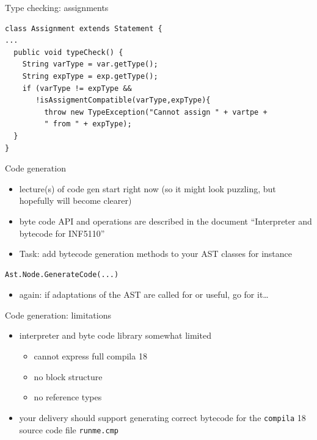 \documentclass{beamer}
\begin{document}
\begin{frame}[fragile,plain,label={sec:org7272385}]{Type checking: assignments}
 \lstset{language=java,label= ,caption= ,captionpos=b,numbers=none}
\begin{lstlisting}
class Assignment extends Statement {
...
  public void typeCheck() {
    String varType = var.getType();
    String expType = exp.getType();
    if (varType != expType &&
       !isAssigmentCompatible(varType,expType){
		 throw new TypeException("Cannot assign " + vartpe + 
		 " from " + expType);
  }
}

\end{lstlisting}
\end{frame}



\begin{frame}[fragile,label={sec:org75e1326}]{Code generation}
 \begin{itemize}
\item lecture(s) of code gen start right now (so it might look puzzling, but
hopefully will become clearer)
\item byte code API and operations are described in the document ``Interpreter
and bytecode for INF5110''

\item \alert{Task:} add bytecode generation methods to your AST classes
for instance
\end{itemize}

\begin{verbatim}
Ast.Node.GenerateCode(...)
\end{verbatim}
\begin{itemize}
\item again: if adaptations of the AST are called for or useful, go for it\ldots{}
\end{itemize}
\end{frame}


\begin{frame}[fragile,label={sec:org8c5788e}]{Code generation: limitations}
 \begin{itemize}
\item interpreter and byte code library somewhat \alert{limited}
\begin{itemize}
\item cannot express full compila 18
\item no block structure
\item no reference types
\end{itemize}
\end{itemize}


\begin{itemize}
\item your delivery should support generating correct bytecode
for the \texttt{compila} 18 source code file \texttt{runme.cmp}
\end{itemize}
\end{frame}
\end{document}
